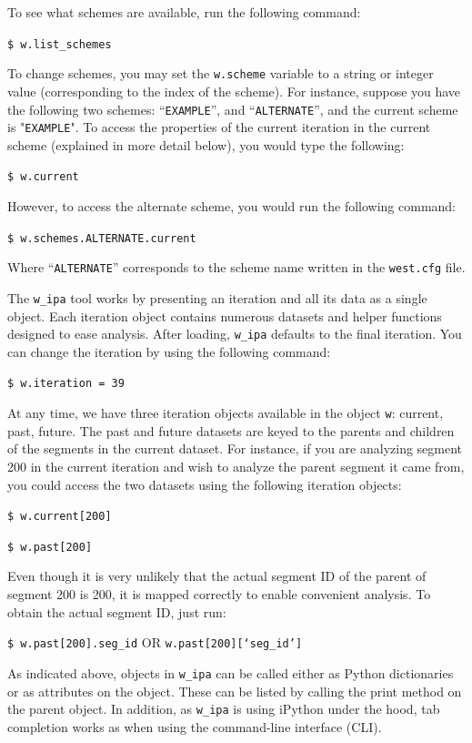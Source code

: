 \documentclass[9pt,tutorial,pubversion]{livecoms}
\begin{document}
To see what schemes are available, run the following command:

\verb|$ w.list_schemes|

To change schemes, you may set the \verb|w.scheme| variable to a string or integer value (corresponding to the index of the scheme). 
For instance, suppose you have the following two schemes: “\verb|EXAMPLE|”, and “\verb|ALTERNATE|”, and the current scheme is "\verb|EXAMPLE|". 
To access the properties of the current iteration in the current scheme (explained in more detail below), you would type the following:

\verb|$ w.current|

However, to access the alternate scheme, you would run the following command:

\verb|$ w.schemes.ALTERNATE.current|

Where “\verb|ALTERNATE|” corresponds to the scheme name written in the \verb|west.cfg| file.

The \verb|w_ipa| tool works by presenting an iteration and all its data as a single object. Each iteration object contains numerous datasets and helper functions designed to ease analysis. 
After loading, \verb|w_ipa| defaults to the final iteration. 
You can change the iteration by using the following command: 

\verb|$ w.iteration = 39|

At any time, we have three iteration objects available in the object \verb|w|: current, past, future. 
The past and future datasets are keyed to the parents and children of the segments in the current dataset. 
For instance, if you are analyzing segment 200 in the current iteration and wish to analyze the parent segment it came from, you could access the two datasets using the following iteration objects:

\verb|$ w.current[200]|

\verb|$ w.past[200]|

Even though it is very unlikely that the actual segment ID of the parent of segment 200 is 200, it is mapped correctly to enable convenient analysis. 
To obtain the actual segment ID, just run:

\verb|$ w.past[200].seg_id| OR \verb|w.past[200][‘seg_id’]|

As indicated above, objects in \verb|w_ipa| can be called either as Python dictionaries or as attributes on the object. 
These can be listed by calling the print method on the parent object. 
In addition, as \verb|w_ipa| is using iPython under the hood, tab completion works as when using the command-line interface (CLI).
\end{document}
